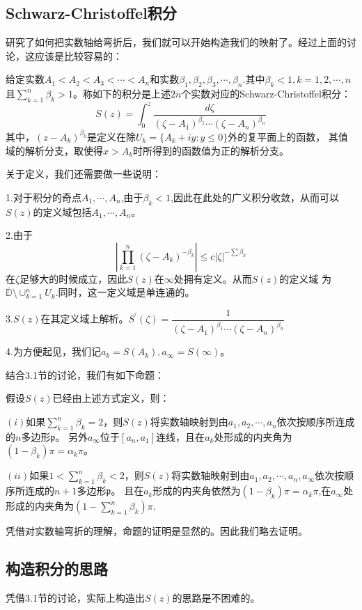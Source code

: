 \documentclass[UTF8]{ctexart}[a4paper,10pt]
\def\D{\mathbb{D}}
\begin{document}
    \subsection{Schwarz-Christoffel积分}
    研究了如何把实数轴给弯折后，我们就可以开始构造我们的映射了。经过上面的讨论，这应该是比较容易的：
    \begin{defn}
        给定实数$A_1<A_2<A_3<\cdots<A_n$和实数$\beta_1,\beta_2,\beta_3,\cdots,\beta_n$.其中$\beta_k<1,k=1,2,\cdots,n$
        且$\displaystyle \sum_{k=1}^n\beta_k>1$。称如下的积分是上述$2n$个实数对应的Schwarz-Christoffel积分：
        $$
        S(z)=\int_0^z \frac{d\zeta}{(\zeta-A_1)^{\beta_1}\cdots(\zeta-A_n)^{\beta_n}}
        $$
        其中，$(z-A_k)^{\beta_k}$是定义在除$U_k=\{A_k+iy:y\leq 0\}$外的复平面上的函数，
        其值域的解析分支，取使得$x>A_k$时所得到的函数值为正的解析分支。
    \end{defn}
    关于定义，我们还需要做一些说明：

    1.对于积分的奇点$A_1,\cdots,A_n$,由于$\beta_k<1$,因此在此处的广义积分收敛，从而可以$S(z)$的定义域包括$A_1,\cdots,A_n$。

    2.由于
    $$
    \left|\prod_{k=1}^n (\zeta-A_k)^{-\beta_k}\right|\leq c|\zeta|^{-\sum\beta_k} 
    $$
    在$\zeta$足够大的时候成立，因此$S(z)$在$\infty$处拥有定义。从而$S(z)$的定义域
    为$\overline{\D}\setminus\displaystyle\cup_{k=1}^n U_k$.同时，这一定义域是单连通的。

    3.$S(z)$在其定义域上解析。$S^{'}(\zeta)=\dfrac{1}{(\zeta-A_1)^{\beta_1}\cdots(\zeta-A_n)^{\beta_n}}$

    4.为方便起见，我们记$a_k=S(A_k),a_\infty=S(\infty)$。
    
    结合3.1节的讨论，我们有如下命题：
    \begin{pro}
        假设$S(z)$已经由上述方式定义，则：

        $(i)$如果$\sum_{k=1}^n \beta_k=2$，则$S(z)$将实数轴映射到由$a_1,a_2,\cdots,a_n$依次按顺序所连成的$n$多边形$\mathfrak{p}$。
        另外$a_\infty$位于$[a_n,a_1]$连线，且在$a_k$处形成的内夹角为$(1-\beta_k)\pi=\alpha_k \pi$。

        $(ii)$如果$1<\sum_{k=1}^n \beta_k<2$，则$S(z)$将实数轴映射到由$a_1,a_2,\cdots,a_n,a_\infty$依次按顺序所连成的$n+1$多边形$\mathfrak{p}$。
        且在$a_k$形成的内夹角依然为$(1-\beta_k)\pi=\alpha_k \pi$,在$a_\infty$处形成的内夹角为$(1-\sum_{k=1}^n \beta_k)\pi$.
    \end{pro}
    凭借对实数轴弯折的理解，命题的证明是显然的。因此我们略去证明。
    \subsection{构造积分的思路}
    凭借3.1节的讨论，实际上构造出$S(z)$的思路是不困难的。
    
\end{document}
